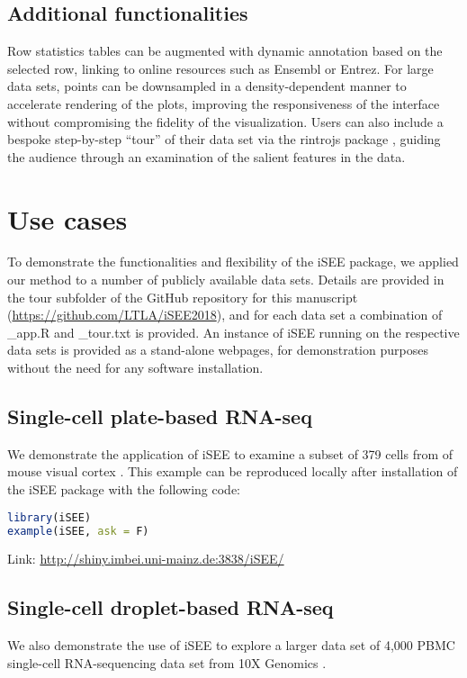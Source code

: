 \documentclass[10pt,a4paper,twocolumn]{article}
\let\cite\citep
\begin{document}
\subsection*{Additional functionalities}
Row statistics tables can be augmented with dynamic annotation based on the selected row, linking to online resources such as Ensembl or Entrez. %
For large data sets, points can be downsampled in a density-dependent manner to accelerate rendering of the plots, improving the responsiveness of the interface without compromising the fidelity of the visualization.
Users can also include a bespoke step-by-step ``tour'' of their data set via the rintrojs package \cite{ganz2016rintrojs}, guiding the audience through an examination of the salient features in the data.

\section*{Use cases} %
To demonstrate the functionalities and flexibility of the iSEE package, we applied our method to a number of publicly available data sets.
Details are provided in the tour subfolder of the GitHub repository for this manuscript (\url{https://github.com/LTLA/iSEE2018}), and for each data set a combination of \_app.R and \_tour.txt is provided.
An instance of iSEE running on the respective data sets is provided as a stand-alone webpages, for demonstration purposes without the need for any software installation.

\subsection*{Single-cell plate-based RNA-seq}
We demonstrate the application of iSEE to examine a subset of 379 cells from of mouse visual cortex \citep{tasic2016allen}.
This example can be reproduced locally after installation of the iSEE package with the following code:

\begin{lstlisting}[language=R]
library(iSEE)
example(iSEE, ask = F)
\end{lstlisting}

Link: \url{http://shiny.imbei.uni-mainz.de:3838/iSEE/}

\subsection*{Single-cell droplet-based RNA-seq}
We also demonstrate the use of iSEE to explore a larger data set of 4,000 PBMC single-cell RNA-sequencing data set from 10X Genomics \citep{zheng2017massively}.
\end{document}
